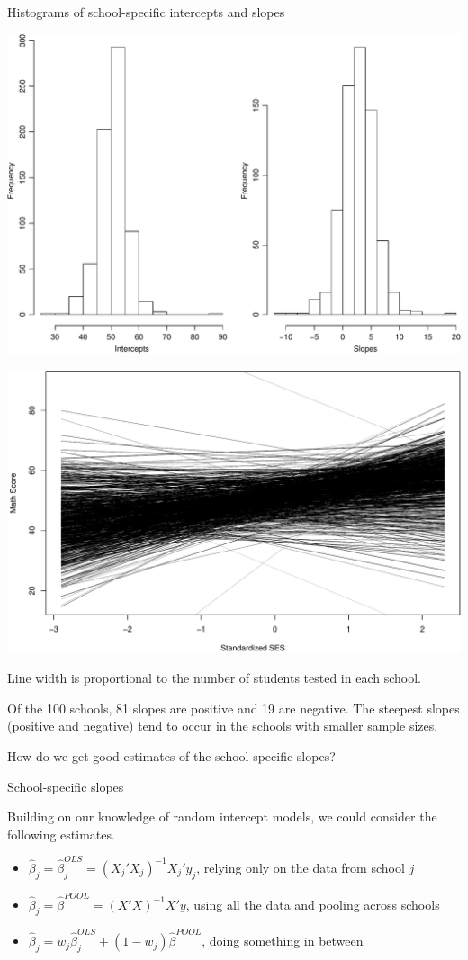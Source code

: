 \documentclass[ignorenonframetext,]{beamer}
\begin{document}
\begin{frame}{Histograms of school-specific intercepts and slopes}

\includegraphics{anova_06_deck_files/figure-beamer/hist-1.pdf}

\end{frame}

\begin{frame}{}

\includegraphics[width=0.5\linewidth]{anova_06_deck_files/figure-beamer/schoolspecific2c-1}

Line width is proportional to the number of students tested in each
school.

Of the 100 schools, 81 slopes are positive and 19 are negative. The
steepest slopes (positive and negative) tend to occur in the schools
with smaller sample sizes.

How do we get good estimates of the school-specific slopes?

\end{frame}

\begin{frame}{School-specific slopes}

Building on our knowledge of random intercept models, we could consider
the following estimates.

\begin{itemize}
\item
  \(\widehat{\beta}_j=\widehat{\beta}_j^{OLS}=(X_j'X_j)^{-1}X_j'y_j\),
  relying only on the data from school \(j\)
\item
  \(\widehat{\beta}_j=\widehat{\beta}^{POOL}=(X'X)^{-1}X'y\), using all
  the data and pooling across schools
\item
  \(\widehat{\beta}_j=w_j\widehat{\beta}_j^{OLS} + (1-w_j)\widehat{\beta}^{POOL}\),
  doing something in between
\end{itemize}

\end{frame}
\end{document}
